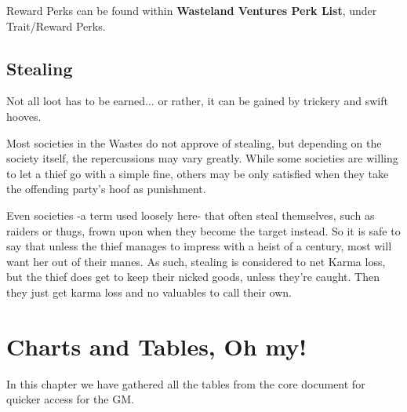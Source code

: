 \documentclass[11pt,a4paper,twocolumn]{book}
\begin{document}
    Reward Perks can be found within \textbf{Wasteland Ventures Perk List}, under Trait/Reward Perks.
    
    \section*{Stealing}
    Not all loot has to be earned... or rather, it can be gained by trickery and swift hooves. 
    
    Most societies in the Wastes do not approve of stealing, but depending on the society itself, the repercussions may vary greatly. While some societies are willing to let a thief go with a simple fine, others may be only satisfied when they take the offending party's hoof as punishment.
    
    Even societies -a term used loosely here- that often steal themselves, such as raiders or thugs, frown upon when they become the target instead. So it is safe to say that unless the thief manages to impress with a heist of a century, most will want her out of their manes. As such, stealing is considered to net Karma loss, but the thief does get to keep their nicked goods, unless they're caught. Then they just get karma loss and no valuables to call their own.
    
    
    \chapter{Charts and Tables, Oh my!}
    In this chapter we have gathered all the tables from the core document for quicker access for the GM.
    
\end{document}

